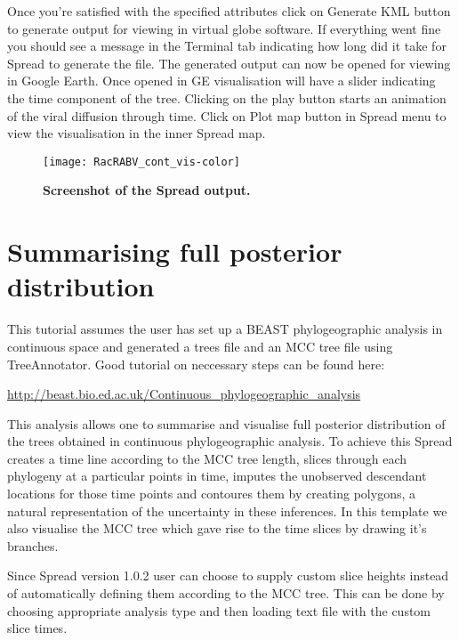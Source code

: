 Once you're satisfied with the specified attributes click on Generate
KML button to generate output for viewing in virtual globe software.
If everything went fine you should see a message in the Terminal tab
indicating how long did it take for Spread to generate the file. The
generated output can now be opened for viewing in Google Earth. Once
opened in GE visualisation will have a slider indicating the time
component of the tree. Clicking on the play button starts an animation
of the viral diffusion through time. Click on Plot map button in Spread
menu to view the visualisation in the inner Spread map.

\begin{figure}[H]
\begin{centering}
\texttt{[image: RacRABV\_cont\_vis-color]}
\caption{
{ \footnotesize 
{\bf Screenshot of the Spread output.}
} %
}
\label{fig:RacRABV_cont_vis}
\par\end{centering}
\end{figure}

\section{Summarising full posterior distribution}

This tutorial assumes the user has set up a BEAST phylogeographic
analysis in continuous space and generated a trees file and an MCC
tree file using TreeAnnotator. Good tutorial on neccessary steps can
be found here:

\url{http://beast.bio.ed.ac.uk/Continuous_phylogeographic_analysis}

\noindent
This analysis allows one to summarise and visualise full posterior
distribution of the trees obtained in continuous phylogeographic analysis.
To achieve this Spread creates a time line according to the MCC tree
length, slices through each phylogeny at a particular points in time,
imputes the unobserved descendant locations for those time points
and contoures them by creating polygons, a natural representation
of the uncertainty in these inferences. In this template we also visualise
the MCC tree which gave rise to the time slices by drawing it's branches.

Since Spread version 1.0.2 user can choose to supply custom slice
heights instead of automatically defining them according to the MCC
tree. This can be done by choosing appropriate analysis type and then
loading text file with the custom slice times.


